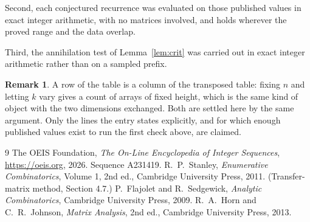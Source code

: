 \documentclass[11pt,a4paper]{article}
\theoremstyle{plain}
\theoremstyle{definition}
\newtheorem{remark}[theorem]{Remark}
\begin{document}
Second, each conjectured recurrence was evaluated on those published values in exact
integer arithmetic, with no matrices involved, and holds wherever the proved range and the
data overlap.

Third, the annihilation test of Lemma~\ref{lem:crit} was carried out in exact integer
arithmetic rather than on a sampled prefix.

\begin{remark}
A row of the table is a column of the transposed table: fixing $n$ and letting $k$ vary gives a
count of arrays of fixed height, which is the same kind of object with the two dimensions
exchanged. Both are settled here by the same argument. Only the lines the entry states
explicitly, and for which enough published values exist to run the first check above, are
claimed.
\end{remark}

\begin{thebibliography}{9}
 The OEIS Foundation, \emph{The On-Line Encyclopedia of Integer
Sequences}, \url{https://oeis.org}, 2026. Sequence A231419.
 R.~P.~Stanley, \emph{Enumerative Combinatorics}, Volume 1, 2nd ed.,
Cambridge University Press, 2011. (Transfer-matrix method, Section 4.7.)
 P.~Flajolet and R.~Sedgewick, \emph{Analytic Combinatorics}, Cambridge
University Press, 2009.
 R.~A.~Horn and C.~R.~Johnson, \emph{Matrix Analysis}, 2nd ed., Cambridge
University Press, 2013.
\end{thebibliography}
\end{document}
